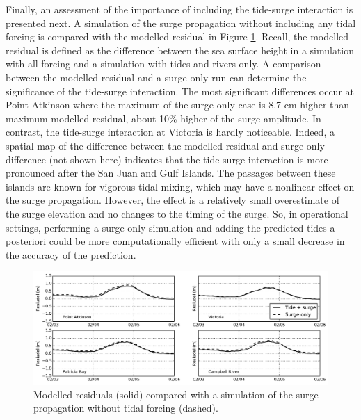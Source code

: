 \documentclass[pdftex,10pt]{article}
\begin{document}
Finally, an assessment of the importance of including the tide-surge interaction is presented next. A simulation of the surge propagation without including any tidal forcing is compared with the modelled residual in Figure \ref{fig:tidesurge}.  Recall, the modelled residual is defined as the difference between the sea surface height in a simulation with all forcing and a simulation with tides and rivers only. A comparison between the modelled residual and a surge-only run can determine the significance of the tide-surge interaction. The most significant differences occur at Point Atkinson where the maximum of the surge-only case is 8.7 cm higher than maximum modelled residual, about 10\% higher of the surge amplitude.  In contrast, the tide-surge interaction at Victoria is hardly noticeable. Indeed, a spatial map of the difference between the modelled residual and surge-only difference (not shown here) indicates that the tide-surge interaction is more pronounced after the San Juan and Gulf Islands. The passages between these islands are known for vigorous tidal mixing, which may have a nonlinear effect on the surge propagation. However, the effect is a relatively small overestimate of the surge elevation and no changes to the timing of the surge. So, in operational settings, performing a surge-only simulation and adding the predicted tides a posteriori could be more computationally efficient with only a small decrease in the accuracy of the prediction. 

\begin{figure}
\centering
\includegraphics[scale=0.6]{Figures/feb2006_tidesurge.pdf}
\caption{Modelled residuals (solid) compared with a simulation of the surge propagation without tidal forcing (dashed). }
\label{fig:tidesurge}
\end{figure}
\end{document}

